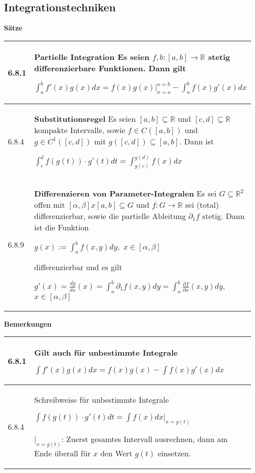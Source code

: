 \subsection{Integrationstechniken}

    \noindent 
    \textbf{Sätze}
    
    \begin{longtable}{p{1cm} p{16cm}}
        \toprule

        6.8.1 & \textbf{Partielle Integration} \hfill \break
                Es seien $f,b :[a,b] \rightarrow \mathbb{R}$ stetig differenzierbare Funktionen. Dann gilt \hfill \break
                \centerline{$ \int_a^b f'(x) g(x) dx = f(x) g(x) \vert_{x=a}^{x=b} - \int_a^b f(x) g'(x) dx $} \\
        \midrule
        6.8.4 & \textbf{Substitutionsregel} \hfill \break
                Es seien $[a,b] \subseteq \mathbb{R}$ und $[c,d] \subseteq \mathbb{R}$ kompakte Intervalle, sowie $f \in C([a,b])$ und 
                $g \in C^1([c,d])$ mit $g([c,d]) \subseteq [a,b]$. Dann ist \hfill \break
                \centerline{$ \int_c^d f(g(t)) \cdot g'(t) dt = \int^{g(d)}_{g(c)} f(x) dx $} \\
        \midrule
        6.8.9 & \textbf{Differenzieren von Parameter-Integralen} \hfill \break
                Es sei $G \subseteq \mathbb{R}^2$ offen mit $[\alpha, \beta] x [a,b] \subseteq G$ und $f: G \rightarrow \mathbb{R}$ sei 
                (total) differenzierbar, sowie die partielle Ableitung $\partial_1 f$ stetig. Dann ist die Funktion \hfill \break
                \centerline{$ g(x) := \int_a^b f(x,y) dy,$ $x \in [\alpha, \beta] $}
                differenzierbar und es gilt \hfill \break
                \centerline{$ g'(x) = \frac{dg}{dx}(x) = \int_a^b \partial_1 f(x,y) dy = \int_a^b \frac{\partial f}{\partial x}(x,y)dy,$
                 $x \in [\alpha, \beta]$} \\

        \bottomrule
    \end{longtable}
    

    \noindent
    \textbf{Bemerkungen}
    
    \begin{longtable}{p{1cm} p{16cm}}
        \toprule

        6.8.1 & Gilt auch für unbestimmte Integrale \hfill \break
                \centerline{$ \int f'(x)g(x)dx = f(x) g(x) - \int f(x)g'(x) dx$} \\
        \midrule
        6.8.4 & Schreibweise für unbestimmte Integrale \hfill \break
                \centerline{$ \int f(g(t)) \cdot g'(t) dt = \int f(x) dx \vert_{x=g(t)}$}
                $\vert_{x=g(t)}$: Zuerst gesamtes Intervall ausrechnen, dann am Ende überall für $x$ den Wert $g(t)$ einsetzen. \\   

        \bottomrule
    \end{longtable}
    

